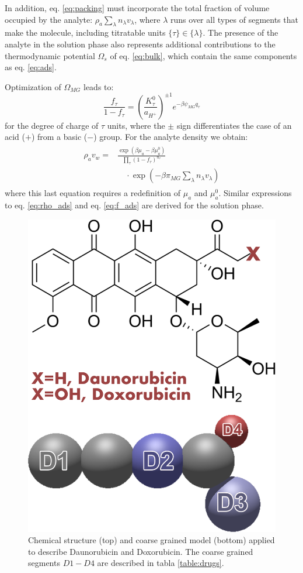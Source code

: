 In addition, eq. \ref{eq:packing} must incorporate the total fraction of volume occupied by the analyte: $\rho_a \sum_\lambda n_\lambda v_\lambda$, where $\lambda$ runs over all types of segments that make the molecule, including titratable units $\{\tau\}\in\{\lambda\}$.
The presence of the analyte in the solution phase also represents additional contributions to the thermodynamic potential $\Omega_s$ of eq. \ref{eq:bulk}, which contain the same components as eq. \ref{eq:ads}. 


Optimization of $\Omega_{MG}$  leads to:
%
\begin{equation}
\frac{f_\tau}{1-f_\tau}=\left(\frac{K^0_\tau}{a_{H^+}}\right)^{\pm 1} e^{-\beta \psi_{MG} q_\tau}
\label{eq:f_ads}
\end{equation}
%
\noindent for the degree of charge of $\tau$ units, where the $\pm$ sign differentiates the case of an acid ($+$) from a basic ($-$) group.
For the analyte density we obtain:
%
\begin{align}
    \begin{aligned}
   \rho_a v_w =&\frac{ \exp{\left(\beta \mu_a - \beta \mu^0_a \right)}}{\prod_\tau \left(1-f_\tau\right)^{n_\tau}}\\
&\quad \cdot\exp{\left(-\beta \pi_{MG} \sum_\lambda n_\lambda v_\lambda \right)} 
    \end{aligned}\label{eq:rho_ads}
\end{align}
%
\noindent where this last equation requires a redefinition of $\mu_a$ and $\mu_a^0$.
Similar expressions to eq. \ref{eq:rho_ads} and eq. \ref{eq:f_ads} are derived for the solution phase.







\begin{figure}[!tb]
\centering
\includegraphics[width=0.35\linewidth]{Figures/graph-gel/dauno-doxo.png}
\caption{Chemical structure (top) and coarse grained model (bottom) applied to describe Daunorubicin and Doxorubicin.
The coarse grained segments $D1-D4$ are described in tabla \ref{table:drugs}.}
\label{fig:dauno-doxo}
\end{figure}



